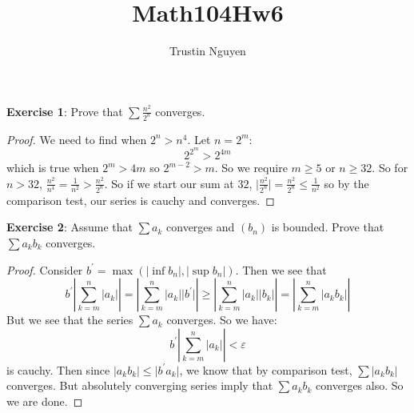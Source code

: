 \documentclass{article}
\title{Math104Hw6}
\author{Trustin Nguyen}
\begin{document}
    \maketitle

\reversemarginpar

\textbf{Exercise 1}: Prove that $\sum\frac{n^{2}}{2^{n}}$ converges.
    \begin{proof}
        We need to find when $2^{n} > n^{4}$. Let $n = 2^{m}$:
            \begin{equation*}
                2^{2^{m}} > 2^{4m}
            \end{equation*}
        which is true when $2^{m} >  4m$ so $2^{m - 2} > m$. So we require $m \geq  5$ or $n \geq 32$. So for $n > 32$, $\frac{n^{2}}{n^{4}} = \frac{1}{n^{2}} > \frac{n^{2}}{2^{n}}$. So if we start our sum at $32$, $\lvert \frac{n^{2}}{2^{n}} \rvert = \frac{n^{2}}{2^{n}} \leq \frac{1}{n^{2}}$ so by the comparison test, our series is cauchy and converges.
    \end{proof}

\textbf{Exercise 2}: Assume that $\sum a_{k}$ converges and $(b_{n})$ is bounded. Prove that $\sum a_{k}b_{k}$ converges.
    \begin{proof}
        Consider $b^{\prime} = \max(\lvert \inf b_{n} \rvert, \lvert \sup b_{n} \rvert)$. Then we see that 
            \begin{equation*}
                b^{\prime}\left\lvert \sum_{k = m}^{n}\lvert a_{k} \rvert \right\rvert = \left\lvert \sum_{k = m}^{n}\lvert a_{k} \rvert \lvert b^{\prime} \rvert \right\rvert \geq \left\lvert \sum_{k = m}^{n}\lvert a_{k} \rvert \lvert b_{k} \rvert \right\rvert = \left\lvert \sum_{k = m}^{n}\lvert a_{k}b_{k} \rvert \right\rvert
            \end{equation*}
        But we see that the series $\sum a_{k}$ converges. So we have:
            \begin{equation*}
                 b^{\prime}\left\lvert \sum_{k = m}^{n}\lvert a_{k} \rvert \right\rvert < \varepsilon
            \end{equation*}
        is cauchy. Then since $\lvert a_{k}b_{k} \rvert \leq \lvert b^{\prime}a_{k} \rvert$, we know that by comparison test, $\sum \lvert a_{k}b_{k} \rvert$ converges. But absolutely converging series imply that $\sum a_{k}b_{k}$ converges also. So we are done.
    \end{proof}
\end{document}

